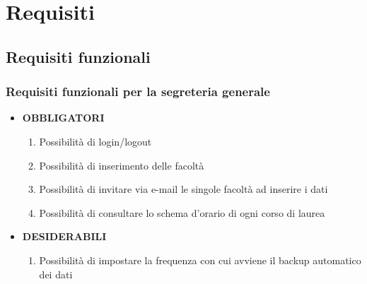 \documentclass[11pt,a4paper]{article}
\begin{document}
\section{Requisiti} \label{requisiti}
\subsection{Requisiti funzionali}
\subsubsection{Requisiti funzionali per la segreteria generale}
\begin{itemize}
\item \textbf{OBBLIGATORI}
\begin{enumerate}
\item Possibilità di login/logout
\item Possibilità di inserimento delle facoltà
\item Possibilità di invitare via e-mail le singole facoltà ad inserire i dati
\item Possibilità di consultare lo schema d'orario di ogni corso di laurea
\end{enumerate}
\item \textbf{DESIDERABILI}
\begin{enumerate}
\item Possibilità di impostare la frequenza con cui avviene il backup automatico dei dati
\end{enumerate}
\end{itemize}
\end{document}
